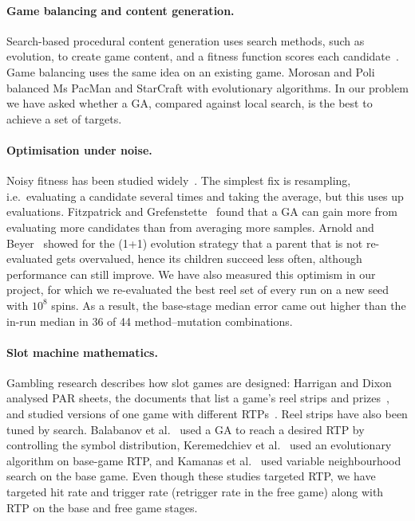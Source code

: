 
\paragraph{Game balancing and content generation.} Search-based procedural content generation uses search methods, such as evolution, to create game content, and a fitness function scores each candidate~\cite{togelius2011search}. Game balancing uses the same idea on an existing game. Morosan and Poli~\cite{morosan2017automated} balanced Ms PacMan and StarCraft with evolutionary algorithms. In our problem we have asked whether a GA, compared against local search, is the best to achieve a set of targets.

\paragraph{Optimisation under noise.} Noisy fitness has been studied widely~\cite{jin2005evolutionary,rakshit2017noisy}. The simplest fix is resampling, i.e.\ evaluating a candidate several times and taking the average, but this uses up evaluations. Fitzpatrick and Grefenstette~\cite{fitzpatrick1988genetic} found that a GA can gain more from evaluating more candidates than from averaging more samples. Arnold and Beyer~\cite{arnold2002local} showed for the (1+1) evolution strategy that a parent that is not re-evaluated gets overvalued, hence its children succeed less often, although performance can still improve. We have also measured this optimism in our project, for which we re-evaluated the best reel set of every run on a new seed with $10^8$ spins. As a result, the base-stage median error came out higher than the in-run median in 36 of 44 method--mutation combinations.

\paragraph{Slot machine mathematics.} Gambling research describes how slot games are designed: Harrigan and Dixon analysed PAR sheets, the documents that list a game's reel strips and prizes~\cite{harrigan2009par}, and studied versions of one game with different RTPs~\cite{harrigan2010tight}. Reel strips have also been tuned by search. Balabanov et al.~\cite{balabanov2015slot} used a GA to reach a desired RTP by controlling the symbol distribution, Keremedchiev et al.~\cite{keremedchiev2017slot} used an evolutionary algorithm on base-game RTP, and Kamanas et al.~\cite{kamanas2021slot} used variable neighbourhood search on the base game. Even though these studies targeted RTP, we have targeted hit rate and trigger rate (retrigger rate in the free game) along with RTP on the base and free game stages.

